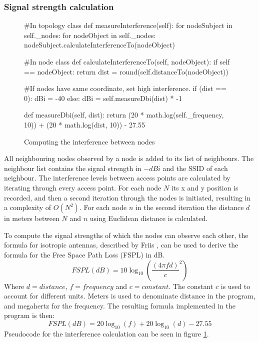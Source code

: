 	\subsubsection{Signal strength calculation}
	\begin{figure}
		\begin{python}
			#In topology class
			def measureInterference(self):
			for nodeSubject in self._nodes:  
			for nodeObject in self._nodes:
			nodeSubject.calculateInterferenceTo(nodeObject) 

			#In node class
			def calculateInterferenceTo(self, nodeObject):
			if self == nodeObject:
			return
			dist = round(self.distanceTo(nodeObject))

			#If  nodes have same coordinate, set high interference. 
			if (dist == 0):
			dBi = -40
			else:
			dBi  = self.measureDbi(dist) * -1

			def measureDbi(self, dist):
			return (20 * math.log(self._frequency, 10)) + 
			(20 * math.log(dist, 10)) - 27.55

		\end{python}
		\caption{Computing the interference between nodes}
		\label{fig:dbiCreation}
	\end{figure}

	All neighbouring nodes observed by a node is added to its list of neighbours. The neighbour list contains the signal strength in $-dBi$ and the SSID of each neighbour.
	The interference levels between access points are calculated by iterating through every access point. For each node $N$ its x and y position is recorded,
	and then a second iteration through the nodes is initiated, resulting in a complexity of $O(N^2)$. For each node $n$ in the second iteration the distance $d$ in
	meters between $N$ and $n$ using Euclidean distance is calculated.
	
	To compute the signal strengths of which the nodes can observe each other, the formula for isotropic antennas, described by Friis \cite{Friis46}, can be used to
	derive the formula for the Free Space Path Loss (FSPL) in dB. 
\[
	FSPL(dB) = 10\log_{10} \left( \frac{ (4 \pi f d)}{c} ^2 \right) 
\]	
	Where $d = distance$, $f = frequency$ and $c=constant$. The constant $c$ is used to account for different units. Meters is used to denominate distance in the program,
	and megahertz for the frequency. The resulting formula implemented in the program is then: 
\[
	FSPL(dB) = 20\log_{10}\left( f \right)  + 20\log_{10} \left(d\right) - 27.55
\]	
	Pseudocode for the interference calculation can be seen in figure \ref{fig:dbiCreation}. 

